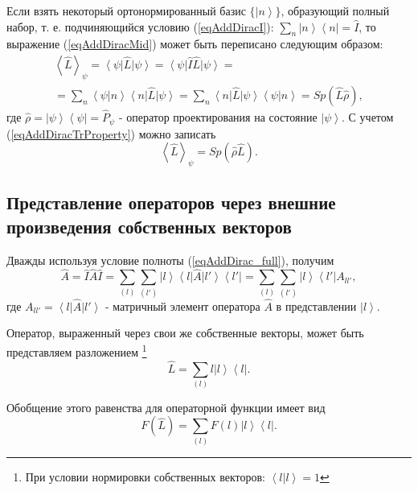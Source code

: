 Если взять некоторый ортонормированный базис $\{\left| n \right>\}$,
образующий полный набор, т. е. подчиняющийся условию
(\ref{eqAddDiracI}): $\sum_n \left| n \right>\left< n \right| =
\hat{I}$, то выражение (\ref{eqAddDiracMid})
может быть переписано следующим образом:
\begin{eqnarray}
\left< \hat{L} \right>_{\psi} = 
\left<\psi\right|\hat{L}\left|\psi\right> = 
\left<\psi\right|\hat{I}\hat{L}\left|\psi\right> = 
\nonumber \\
= 
\sum_n \left<\psi\right|\left.n\right>\left<n\right|
\hat{L}\left|\psi\right> = 
\sum_n \left<n\right|
\hat{L}\left|\psi\right>\left<\psi\right|\left.n\right> = 
Sp \left(\hat{L} \hat{\rho} \right),
\nonumber
\end{eqnarray}
где 
\(
\hat{\rho} = \left|\psi\right>\left<\psi\right| = \hat{P}_{\psi}
\) - оператор проектирования на состояние 
$\left| \psi \right>$.
С учетом (\ref{eqAddDiracTrProperty}) можно записать
\begin{equation}
\left< \hat{L} \right>_{\psi} = Sp \left(\hat{\rho} \hat{L} \right).
\label{eqAddDiracMidViaRho}
\end{equation}

\subsection{Представление  операторов  через  внешние  произведения  
собственных  векторов}
Дважды используя условие полноты (\ref{eqAddDirac_full}), получим
\begin{equation}
\hat{A} = \hat{I} \hat{A} \hat{I} = \sum_{(l)}\sum_{(l')} 
\left|l\right>\left<l\right| \hat{A} \left|l'\right>\left<l'\right| = 
\sum_{(l)}\sum_{(l')} 
\left|l\right>\left<l'\right| A_{ll'},
\end{equation}  
где $A_{ll'} = \left<l\right| \hat{A} \left|l'\right>$ - матричный
элемент оператора $\hat{A}$  в представлении  $\left|l\right>$.
 
Оператор, выраженный через свои же собственные векторы, может быть
представляем разложением \footnote{При условии
 нормировки собственных векторов: $\left<l\right|\left.l\right> = 1$} 
\begin{equation}
\hat{L} = \sum_{(l)} 
l \left|l\right>\left<l\right|.
\end{equation}  

Обобщение этого равенства для операторной функции имеет вид
\begin{equation}
F\left(\hat{L}\right) = \sum_{(l)} 
F\left(l\right) \left|l\right>\left<l\right|.
\label{eqAddDiracFL}
\end{equation}  

